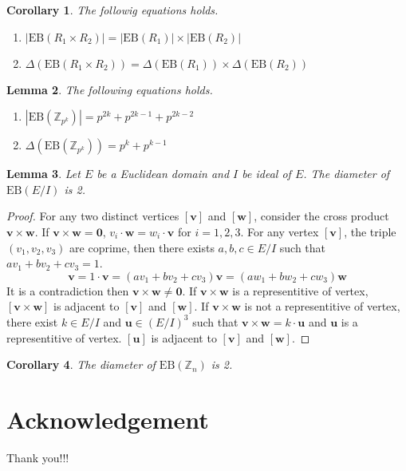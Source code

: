 \documentclass{article}
\newtheorem{Lem}{Lemma}
\newtheorem{Cor}[Lem]{Corollary}
\newcommand{\Z}{\mathbb Z}
\newcommand{\EB}{\mathrm{EB}}
\begin{document}
\begin{Cor}
The followig equations holds.
\begin{enumerate}
\item $ | \EB(R_1 \times R_2) | = | \EB(R_1) | \times | \EB(R_2) | $
\item $ \Delta(\EB(R_1 \times R_2)) = \Delta(\EB(R_1)) \times \Delta( \EB(R_2) )$
\end{enumerate}
\end{Cor}

\fi 

\begin{Lem}
The following equations holds.
\begin{enumerate}
\item $ |\EB(\Z_{p^k})| = p^{2k}+p^{2k-1}+p^{2k-2} $
\item $ \Delta(\EB(\Z_{p^k})) = p^k + p^{k-1} $
\end{enumerate}

\end{Lem}

\begin{Lem}
Let $E$ be a Euclidean domain and $I$ be ideal of $E$. The diameter of $\EB(E/I)$ is 2.
\end{Lem}

\begin{proof}
For any two distinct vertices $[\bm v]$ and $[\bm w]$, consider the cross product $\bm v \times \bm w$. If $\bm v \times \bm w = \bm 0$, $v_i \cdot \bm w = w_i \cdot \bm v$ for $i=1,2,3$. 
For any vertex $[\bm v]$, the triple $(v_1,v_2,v_3)$ are coprime, then there exists $a,b,c \in E/I$ such that $a v_1 + b v_2+ c v_3 = 1$.
\[ \bm v = 1 \cdot \bm v = ( a v_1 + b v_2+ c v_3 ) \bm v = ( a w_1 + b w_2 + c w_3 ) \bm w\]
It is a contradiction then $\bm v \times \bm w \neq \bm 0$. 
If $\bm v \times \bm w$ is a representitive of vertex, $[\bm v \times \bm w]$ is adjacent to $[\bm v]$ and $[\bm w]$.
If $\bm v \times \bm w$ is not a representitive of vertex, there exist $k \in E/I$ and $\bm u \in (E/I)^3$ such that $\bm v \times \bm w = k \cdot \bm u$ and $\bm u$ is a representitive of vertex. $[\bm u]$ is adjacent to $[\bm v]$ and $[\bm w]$.
\end{proof}

\begin{Cor}
The diameter of $\EB(\Z_n)$ is 2.
\end{Cor}

\section{Acknowledgement}
Thank you!!!
\end{document}
